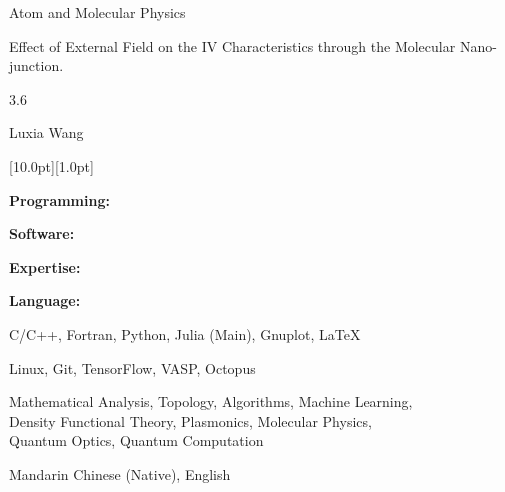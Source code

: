 \documentclass[12pt,a4paper,utf8]{report}
\begin{document}
    \begin{minipage}[t]{11cm}
        Atom and Molecular Physics\par
        Effect of External Field on the IV Characteristics through the Molecular Nano-junction.\par
        3.6\par
        Luxia Wang\par
    \end{minipage}\par
\vspace{0.4cm}

\begin{minipage}[t]{16cm}
    \colorbox{subtitlecolor}{\raisebox{0pt}[10.0pt][1.0pt]{
        \textcolor{white}{\textsf{}}}}
\end{minipage}\par
\vspace{0.2cm}
    \begin{minipage}[t]{4cm}
        \qquad \textbf{Programming:}\par
        \qquad \textbf{Software:}\par
        \qquad \textbf{Expertise:}\par
        \qquad \par
        \qquad \par
        \qquad \textbf{Language:}\par
    \end{minipage}
    \begin{minipage}[t]{14cm}
        C/C++, Fortran, Python, Julia (Main), Gnuplot, \LaTeX \par
        Linux, Git, TensorFlow, VASP, Octopus\par
        Mathematical Analysis, Topology, Algorithms, Machine Learning, \\
        Density Functional Theory, Plasmonics, Molecular Physics, \\
        Quantum Optics, Quantum Computation \par
        Mandarin Chinese (Native), English \par
    \end{minipage}\par
\vspace{0.4cm}
\end{document}
